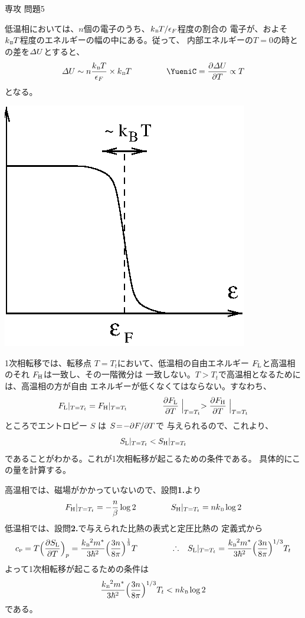 \documentclass[fleqn]{jbook}
\begin{document}
\begin{answer}{専攻 問題5}{}
\begin{subanswers}
\SubAnswer
  \parbox[t]{105mm}{
  低温相においては、$n$個の電子のうち、$\kB T/\epsilon_F$程度の割合の
  電子が、およそ$\kB T$程度のエネルギーの幅の中にある。従って、
  内部エネルギーの$T=0$の時との差を${\mit\Delta} U$とすると、
%
  \[ \IDelta U \sim n \frac{\kB T}{\epsilon_F}\times \kB T \hspace{15mm}%
     \Yueni%
     C = \Partial{\IDelta U}{T} \propto T \]
%
  となる。
  }\parbox[t]{55mm}{\vspace*{-30mm}
  \begin{center}
    \mbox{\includegraphics[clip]{1996phy5-2.eps}}
  \end{center}}

\SubAnswer
  1次相転移では、転移点 $T\!=\!T_t$において、低温相の自由エネルギー
  $F_{\rm L}$と高温相のそれ $F_{\rm H}$は一致し、その一階微分は
  一致しない。$T\!>\!T_t$で高温相となるためには、高温相の方が自由
  エネルギーが低くなくてはならない。すなわち、
%
  \[ F_{\rm L}|_{T=T_t} = F_{\rm H}|_{T=T_t} \hspace{15mm}%
    \Partial{F_{\rm L}}{T}\Bigm|_{T=T_t} > \Partial{F_{\rm H}}{T}\Bigm|_{T=T_t}\]
%
  ところでエントロピー $S$ は $S\!=\!-\partial F / \partial T$で
  与えられるので、これより、
%
  \[ S_{\rm L}|_{T=T_t} < S_{\rm H}|_{T=T_t} \]
%
  であることがわかる。これが1次相転移が起こるための条件である。
  具体的にこの量を計算する。

  高温相では、磁場がかかっていないので、設問{\bf 1.}より
%
  \[ F_{\rm H}|_{T=T_t} = -\frac{n}{\beta}\log{2} \hspace{15mm}%
     S_{\rm H}|_{T=T_t} = n\kB \log{2} \]
%
  低温相では、設問{\bf 2.}で与えられた比熱の表式と定圧比熱の
  定義式から
%
  \[ c\ssub{P}%
     = T \Bigl( \Partial{S_{\rm L}}{T} \Bigr)_p%
     = \frac{\kB^2m^{\ast}}{3\hbar^2}%
       \Bigr(\frac{3n}{8\pi}\Bigr)^{\frac{1}{3}}T \hspace{15mm}%
    \Yueni S_{\rm L}|_{T=T_t} = \frac{\kB^2m^\ast}{3\hbar^2}%
       \Bigl(\frac{3n}{8\pi}\Bigr)^{1/3}T_t \]
%
  よって1次相転移が起こるための条件は
%
  \[ \frac{\kB ^2m^\ast}{3\hbar^2}%
     \Bigl(\frac{3n}{8\pi}\Bigr)^{1/3}T_t < n\kB \log{2} \]
%
  である。


\end{subanswers}
\end{answer}
\end{document}
